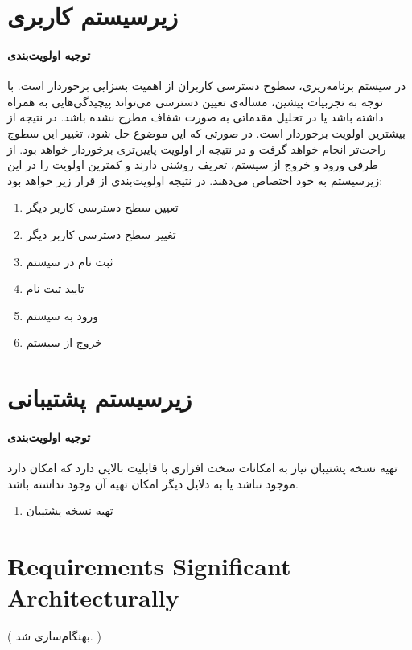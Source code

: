 \section{زیرسیستم کاربری}
\paragraph{توجیه اولویت‌بندی}
در سیستم برنامه‌ریزی، سطوح دسترسی کاربران از اهمیت بسزایی برخوردار است. با توجه به تجربیات پیشین، مساله‌ی تعیین دسترسی می‌تواند پیچیدگی‌هایی به همراه داشته باشد یا در تحلیل مقدماتی به صورت  شفاف مطرح نشده باشد. در نتیجه از بیشترین اولویت برخوردار است. در صورتی که این موضوع حل شود، تغییر این سطوج راحت‌تر انجام خواهد گرفت و در نتیجه از اولویت پایین‌تری برخوردار خواهد بود. از طرفی ورود و خروج از سیستم، تعریف روشنی دارند و کمترین اولویت را در این زیرسیستم به خود اختصاص می‌دهند. در نتیجه اولویت‌بندی از قرار زیر خواهد بود:
\begin{enumerate}
	\item تعیین سطح دسترسی کاربر دیگر
	\item تغییر سطح دسترسی کاربر دیگر
	\item ثبت نام در سیستم
	\item تایید ثبت نام
	\item ورود به سیستم
	\item خروج از سیستم			
\end{enumerate}

\section{زیرسیستم پشتیبانی}
\paragraph{توجیه اولویت‌بندی}
تهیه نسخه پشتیبان نیاز به امکانات سخت افزاری با قابلیت بالایی دارد که امکان دارد موجود نباشد یا به دلایل دیگر امکان تهیه آن وجود نداشته باشد.
\begin{enumerate}
	
	\item تهیه نسخه پشتیبان
\end{enumerate}

\section{Requirements Significant Architecturally}
({\color{red} بهنگام‌سازی شد.}	)
